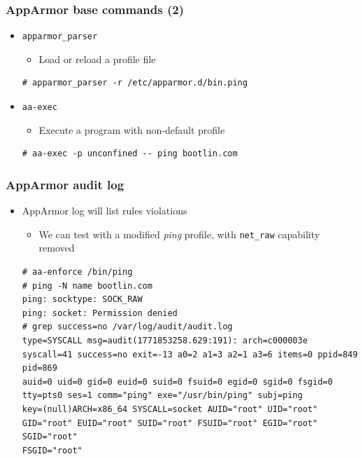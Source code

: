 \begin{frame}[fragile]
	\frametitle{AppArmor base commands (2)}
	\begin{itemize}
		\item \texttt{apparmor\_parser}
			\begin{itemize}
				\item Load or reload a profile file
			\end{itemize}
			\begin{block}{}
				{\tiny
				\begin{verbatim}
# apparmor_parser -r /etc/apparmor.d/bin.ping
\end{verbatim}
}
			\end{block}
		\item \texttt{aa-exec}
			\begin{itemize}
				\item Execute a program with non-default profile
			\end{itemize}
			\begin{block}{}
				{\tiny
				\begin{verbatim}
# aa-exec -p unconfined -- ping bootlin.com
\end{verbatim}
}
			\end{block}
	\end{itemize}
\end{frame}

\begin{frame}[fragile]
	\frametitle{AppArmor audit log}
	\begin{itemize}
		\item AppArmor log will list rules violations
			\begin{itemize}
				\item We can test with a modified \emph{ping} profile, with
					\texttt{net\_raw} capability removed
			\end{itemize}
			\begin{block}{}
				{\tiny
				\begin{verbatim}
# aa-enforce /bin/ping
# ping -N name bootlin.com
ping: socktype: SOCK_RAW
ping: socket: Permission denied
# grep success=no /var/log/audit/audit.log  
type=SYSCALL msg=audit(1771853258.629:191): arch=c000003e syscall=41 success=no exit=-13 a0=2 a1=3 a2=1 a3=6 items=0 ppid=849 pid=869
auid=0 uid=0 gid=0 euid=0 suid=0 fsuid=0 egid=0 sgid=0 fsgid=0 tty=pts0 ses=1 comm="ping" exe="/usr/bin/ping" subj=ping
key=(null)ARCH=x86_64 SYSCALL=socket AUID="root" UID="root" GID="root" EUID="root" SUID="root" FSUID="root" EGID="root" SGID="root"
FSGID="root"
\end{verbatim}
}
			\end{block}
	\end{itemize}
\end{frame}

